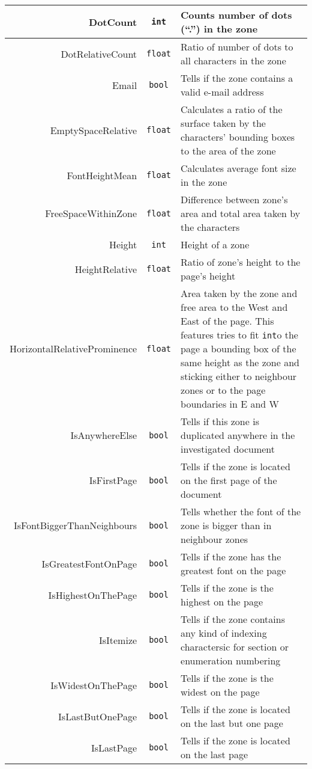 \begin{appendices}
\begin{longtable}[c]{|r|c|p{8cm}|}
DotCount & \verb+int+ & Counts number of dots (``.'') in the zone\\ \hline
DotRelativeCount & \verb+float+ & Ratio of number of dots to all characters in the zone \\ \hline
Email & \verb+bool+ & Tells if the zone contains a valid e-mail address\\ \hline
EmptySpaceRelative & \verb+float+ & Calculates a ratio of the surface taken by the characters' bounding boxes to the area of the zone \\ \hline
FontHeightMean & \verb+float+ & Calculates average font size in the zone \\ \hline
FreeSpaceWithinZone & \verb+float+ & Difference between zone's area and total area taken by the characters\\ \hline
Height & \verb+int+ & Height of a zone\\ \hline
HeightRelative & \verb+float+ & Ratio of zone's height to the page's height\\ \hline
HorizontalRelativeProminence & \verb+float+ & Area taken by the zone and free area to the West and East of the page. This features tries to fit \verb+int+o the page a bounding box of the same height as the zone and sticking either to neighbour zones or to the page boundaries in E and W\\ \hline
IsAnywhereElse & \verb+bool+ & Tells if this zone is duplicated anywhere in the investigated document \\ \hline
IsFirstPage & \verb+bool+ & Tells if the zone is located on the first page of the document \\ \hline
IsFontBiggerThanNeighbours & \verb+bool+ & Tells whether the font of the zone is bigger than in neighbour zones\\ \hline
IsGreatestFontOnPage & \verb+bool+ & Tells if the zone has the greatest font on the page \\ \hline
IsHighestOnThePage & \verb+bool+ & Tells if the zone is the highest on the page \\ \hline
IsItemize & \verb+bool+ & Tells if the zone contains any kind of indexing charactersic for section or enumeration numbering \\ \hline
IsWidestOnThePage & \verb+bool+ & Tells if the zone is the widest on the page\\ \hline
IsLastButOnePage & \verb+bool+ & Tells if the zone is located on the last but one page\\ \hline
IsLastPage & \verb+bool+ & Tells if the zone is located on the last page\\ \hline

\end{longtable}
\end{appendices}
